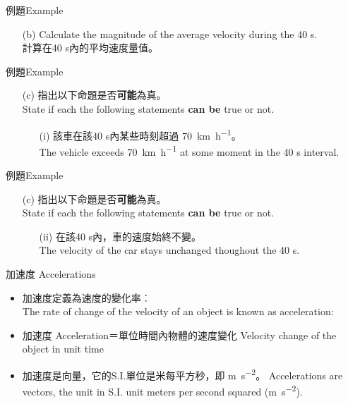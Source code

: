 \documentclass[beamer=true]{standalone}
\begin{document}
\begin{frame}[t]{例題Example}

    \begin{itemize}
        \item [(b)]Calculate the magnitude of the average velocity during the 40 s. \\計算在40 s內的平均速度量值。
    \end{itemize}
\end{frame}
\begin{frame}[t]{例題Example}

    \begin{itemize}
        \item [(c)]指出以下命題是否\textbf{可能}為真。\\State if each the following statements \textbf{can be} true or not.
              \begin{itemize}
                  \item [(i)]該車在該40 s內某些時刻超過 \qty{70}{km.h^{-1}}。\\The vehicle exceeds \qty{70}{km.h^{-1}} at some moment in the 40 s interval.
              \end{itemize}
    \end{itemize}
\end{frame}
\begin{frame}[t]{例題Example}

    \begin{itemize}
        \item [(c)]指出以下命題是否\textbf{可能}為真。\\State if each the following statements \textbf{can be} true or not.
              \begin{itemize}
                  \item [(ii)]在該40 s內，車的速度始終不變。\\The velocity of the car stays unchanged thoughout the 40 s.
              \end{itemize}
    \end{itemize}
\end{frame}
\begin{frame}{加速度 Accelerations}
    \begin{itemize}
        \item 加速度定義為速度的變化率︰ \\The rate of change of the velocity of an object is known as acceleration:
        \item 加速度 Acceleration＝單位時間內物體的速度變化 Velocity change of the object in unit time
        \item 加速度是向量，它的S.I.單位是米每平方秒，即 \unit{m.s^{-2}}。 Accelerations are vectors, the unit in S.I. unit meters per second squared (\unit{m.s^{-2}}).
    \end{itemize}
\end{frame}
\end{document}
